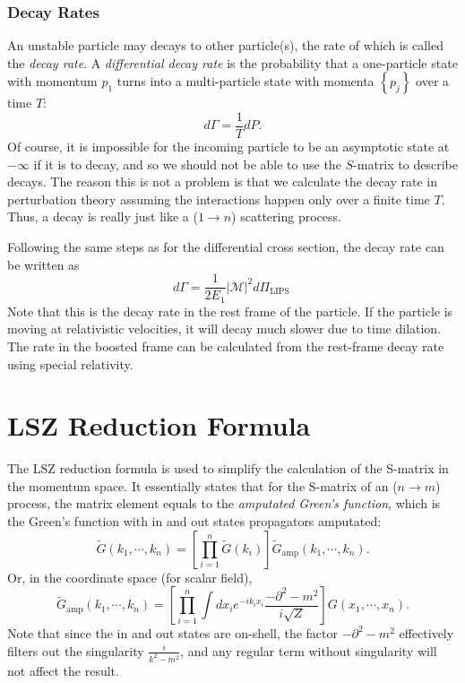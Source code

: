 \documentclass[aps,prb,superscriptaddress,nofootinbib]{revtex4}
\begin{document}
\subsubsection{Decay Rates}
An unstable particle may decays to other particle(s), the rate of which is called the \textit{decay rate}.
A \textit{differential decay rate} is the probability that a one-particle state with momentum $p_{1}$ turns into a multi-particle state with momenta $\left\{p_{j}\right\}$ over a time $T$:
\begin{equation}
	d \Gamma=\frac{1}{T} d P .
\end{equation}
Of course, it is impossible for the incoming particle to be an asymptotic state at $-\infty$ if it is to decay, and so we should not be able to use the $S$-matrix to describe decays. 
The reason this is not a problem is that we calculate the decay rate in perturbation theory assuming the interactions happen only over a finite time $T$. 
Thus, a decay is really just like a ($1 \rightarrow n$) scattering process.

Following the same steps as for the differential cross section, the decay rate can be written as
\begin{equation}
	d \Gamma=\frac{1}{2 E_{1}}|\mathcal{M}|^{2} d \Pi_{\text {LIPS }}
\end{equation}
Note that this is the decay rate in the rest frame of the particle. 
If the particle is moving at relativistic velocities, it will decay much slower due to time dilation. 
The rate in the boosted frame can be calculated from the rest-frame decay rate using special relativity.





\section{LSZ Reduction Formula}

The LSZ reduction formula is used to simplify the calculation of the S-matrix in the momentum space.
It essentially states that for the S-matrix of an ($n \rightarrow m$) process, the matrix element equals to the \textit{amputated Green's function}, which is the Green's function with in and out states propagators amputated:
\begin{equation}
	\tilde{G}(k_1,\cdots,k_n) = \left[\prod_{i=1}^n \tilde{G}(k_i) \right] \tilde{G}_{\mathrm{amp}}(k_1,\cdots,k_n).
\end{equation}
Or, in the coordinate space (for scalar field), 
\begin{equation}
	\tilde{G}_{\mathrm{amp}}(k_1,\cdots,k_n) = \left[\prod_{i=1}^n \int d x_i e^{-i k_i x_i} \frac{-\partial^2-m^2}{i\sqrt Z} \right] G(x_1,\cdots,x_n).
\end{equation}
Note that since the in and out states are on-shell, the factor $-\partial^2-m^2$ effectively filters out the singularity $\frac{i}{k^2-m^2}$, and any regular term without singularity will not affect the result.
\end{document}

